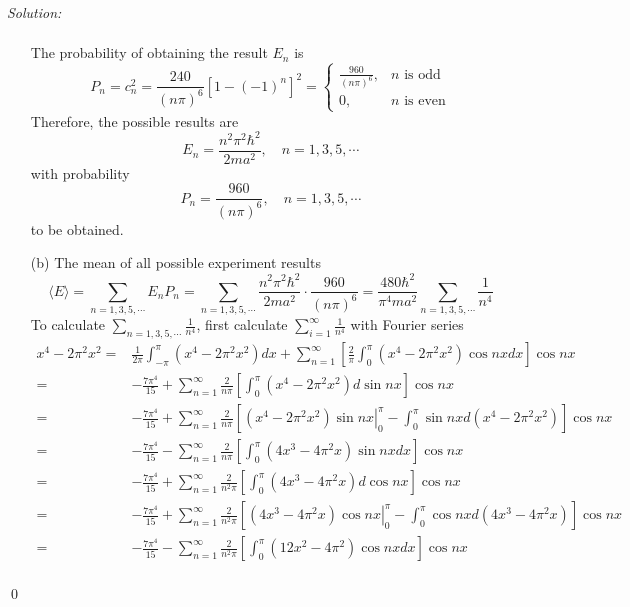 \documentclass[12pt,a4paper]{article}
\newenvironment{sol}
    {\emph{Solution:}
    }
    {
    \qed
    }
\begin{document}
\begin{sol}
\begin{itemize}
\begin{align}
\end{align}
The probability of obtaining the result $E_n$ is
\begin{equation}
P_n=c_n^2=\frac{240}{(n\pi)^6}[1-(-1)^n]^2=\left\{\begin{array}{ll}\frac{960}{(n\pi)^6},&n\text{ is odd}\\0,&n\text{ is even}\end{array}\right.
\end{equation}
Therefore, the possible results are
\begin{equation}
E_n=\frac{n^2\pi^2\hbar^2}{2ma^2},\quad n=1,3,5,\cdots
\end{equation}
with probability
\begin{equation}
P_n=\frac{960}{(n\pi)^6},\quad n=1,3,5,\cdots
\end{equation}
to be obtained.
\item[(b)] The mean of all possible experiment results
\begin{equation}
\langle E\rangle=\sum_{n=1,3,5,\cdots}E_nP_n=\sum_{n=1,3,5,\cdots}\frac{n^2\pi^2\hbar^2}{2ma^2}\cdot\frac{960}{(n\pi)^6}=\frac{480\hbar^2}{\pi^4ma^2}\sum_{n=1,3,5,\cdots}\frac{1}{n^4}
\end{equation}
To calculate $\sum_{n=1,3,5,\cdots}\frac{1}{n^4}$, first calculate $\sum_{i=1}^{\infty}\frac{1}{n^4}$ with Fourier series
\begin{align}
\nonumber x^4-2\pi^2x^2=&\frac{1}{2\pi}\int_{-\pi}^{\pi}(x^4-2\pi^2x^2)dx+\sum_{n=1}^{\infty}\left[\frac{2}{\pi}\int_0^{\pi}(x^4-2\pi^2x^2)\cos nxdx\right]\cos nx\\
\nonumber=&-\frac{7\pi^4}{15}+\sum_{n=1}^{\infty}\frac{2}{n\pi}\left[\int_0^{\pi}(x^4-2\pi^2x^2)d\sin nx\right]\cos nx\\
\nonumber=&-\frac{7\pi^4}{15}+\sum_{n=1}^{\infty}\frac{2}{n\pi}\left[\left.(x^4-2\pi^2x^2)\sin nx\right|_0^{\pi}-\int_0^{\pi}\sin nxd(x^4-2\pi^2x^2)\right]\cos nx\\
\nonumber=&-\frac{7\pi^4}{15}-\sum_{n=1}^{\infty}\frac{2}{n\pi}\left[\int_0^{\pi}(4x^3-4\pi^2x)\sin nxdx\right]\cos nx\\
\nonumber=&-\frac{7\pi^4}{15}+\sum_{n=1}^{\infty}\frac{2}{n^2\pi}\left[\int_0^{\pi}(4x^3-4\pi^2x)d\cos nx\right]\cos nx\\
\nonumber=&-\frac{7\pi^4}{15}+\sum_{n=1}^{\infty}\frac{2}{n^2\pi}\left[\left.(4x^3-4\pi^2x)\cos nx\right|_0^{\pi}-\int_0^{\pi}\cos nxd(4x^3-4\pi^2x)\right]\cos nx\\
\nonumber=&-\frac{7\pi^4}{15}-\sum_{n=1}^{\infty}\frac{2}{n^2\pi}\left[\int_0^{\pi}(12x^2-4\pi^2)\cos nxdx\right]\cos nx\\

\end{align}
\end{itemize}
\end{sol}
\end{document}
